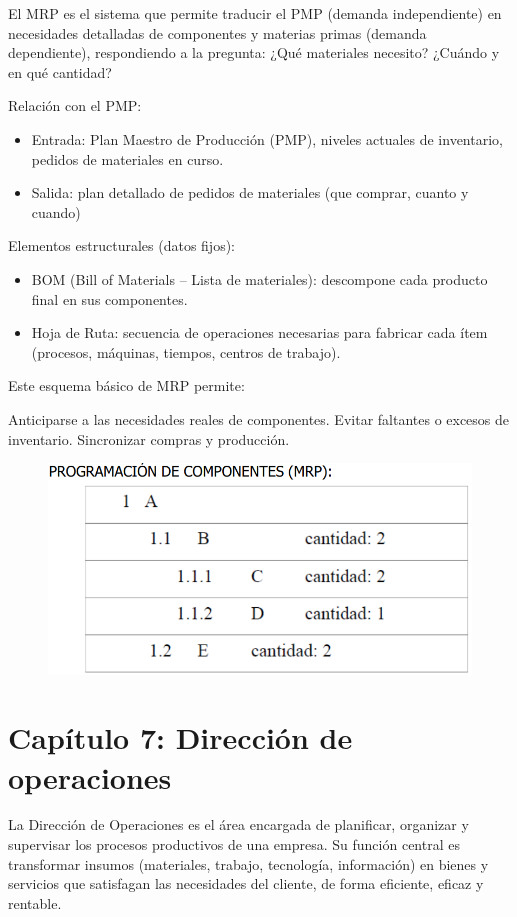 \documentclass[a4paper,oneside,11pt]{article}
\begin{document}
El MRP es el sistema que permite traducir el PMP (demanda independiente) en necesidades detalladas de componentes y materias primas (demanda dependiente), respondiendo a la pregunta: ¿Qué materiales necesito? ¿Cuándo y en qué cantidad?

Relación con el PMP: 
\begin{itemize}
    \item Entrada: Plan Maestro de Producción (PMP), niveles actuales de inventario, pedidos de materiales en curso.
    \item Salida: plan detallado de pedidos de materiales (que comprar, cuanto y cuando)
\end{itemize}

Elementos estructurales (datos fijos):
\begin{itemize}
    \item BOM (Bill of Materials – Lista de materiales): descompone cada producto final en sus componentes.
    \item Hoja de Ruta: secuencia de operaciones necesarias para fabricar cada ítem (procesos, máquinas, tiempos, centros de trabajo).
\end{itemize}


Este esquema básico de MRP permite:

Anticiparse a las necesidades reales de componentes.
Evitar faltantes o excesos de inventario.
Sincronizar compras y producción.

\begin{figure} [ht!]
    \centering  \includegraphics[width=0.75\linewidth]{mrp ejemplo.png}
\end{figure}
\clearpage

\section{Capítulo 7: Dirección de operaciones}

La Dirección de Operaciones es el área encargada de planificar, organizar y supervisar los procesos productivos de una empresa. Su función central es transformar insumos (materiales, trabajo, tecnología, información) en bienes y servicios que satisfagan las necesidades del cliente, de forma eficiente, eficaz y rentable.
\end{document}
